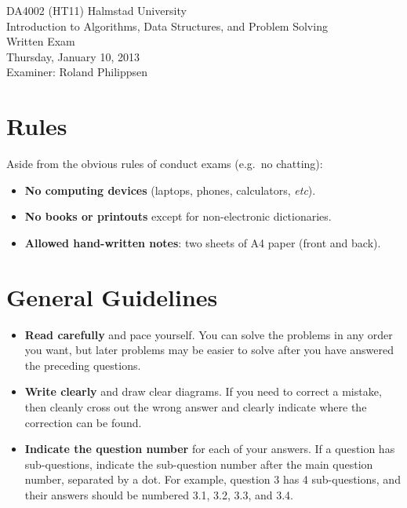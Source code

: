 \documentclass[a4paper]{article}
\newcounter{question}
\begin{document}
\pagestyle{empty}
\thispagestyle{empty}



\noindent
\begin{minipage}{\columnwidth}
  \centering
  \Large
  DA4002 (HT11) Halmstad University\\
  Introduction to Algorithms, Data Structures, and Problem Solving\\[3\baselineskip]
  \Huge
  Written Exam\\
  \Large
  Thursday, January 10, 2013\\[2\baselineskip]
  Examiner: Roland Philippsen
\end{minipage}

\vfill

\noindent
\begin{center}
\end{center}

\vfill



\section*{Rules}

Aside from the obvious rules of conduct exams (e.g.\ no chatting):

\begin{itemize}
\item
  \textbf{No computing devices} (laptops, phones, calculators, \emph{etc}).
\item
  \textbf{No books or printouts} except for non-electronic dictionaries.
\item
  \textbf{Allowed hand-written notes}: two sheets of A4 paper (front and back).
\end{itemize}



\section*{General Guidelines}

\begin{itemize}
\item
  \textbf{Read carefully} and pace yourself.
  You can solve the problems in any order you want, but later problems may be easier to solve after you have answered the preceding questions.
\item
  \textbf{Write clearly} and draw clear diagrams.
  If you need to correct a mistake, then cleanly cross out the wrong answer and clearly indicate where the correction can be found.
\item
  \textbf{Indicate the question number} for each of your answers.
  If a question has sub-questions, indicate the sub-question number after the main question number, separated by a dot.
  For example, question 3 has 4 sub-questions, and their answers should be numbered 3.1, 3.2, 3.3, and 3.4.
\end{itemize}
\end{document}
